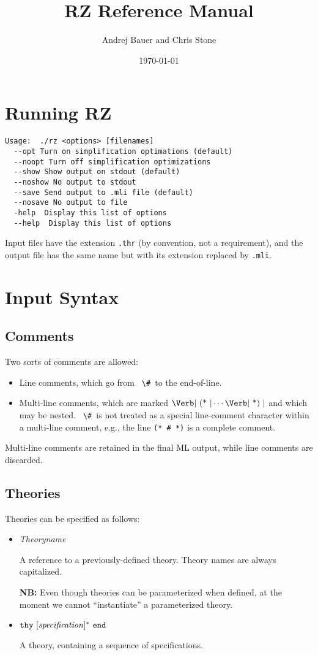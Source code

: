 \documentclass[11pt]{article}
\title{RZ Reference Manual}
\date{\today}
\author{Andrej Bauer and Chris Stone}
\newcommand{\keywd}[1]{\mbox{\texttt{#1}}\xspace}
\newcommand{\END}{\keywd{end}}
\newcommand{\THY}{\keywd{thy}}
\newcommand{\metav}[1]{\mbox{\textit{#1}}\xspace}
\newcommand{\TIdentifier}{\metav{Theoryname}}
\newcommand{\Specification}{\metav{specification}}
\newcommand{\HASH}{\mbox{\Verb| \# |}}
\newcommand{\LCOMMENT}{\mbox{\Verb| (* |}}
\newcommand{\RCOMMENT}{\mbox{\Verb| *) |}}
\newcommand{\NB}{\textbf{NB: }}
\begin{document}
\maketitle

\section{Running RZ}

\begin{Verbatim}
Usage:  ./rz <options> [filenames]
  --opt Turn on simplification optimations (default)
  --noopt Turn off simplification optimizations
  --show Show output on stdout (default)
  --noshow No output to stdout
  --save Send output to .mli file (default)
  --nosave No output to file
  -help  Display this list of options
  --help  Display this list of options
\end{Verbatim}

Input files have the extension \Verb|.thr| (by convention, not a requirement), and the 
output file has the same name but with its extension replaced by \Verb|.mli|.

\section{Input Syntax}

\subsection{Comments}

Two sorts of comments are allowed:
\begin{itemize}
\item Line comments, which go from \HASH to the end-of-line.
\item Multi-line comments, which are marked $\LCOMMENT \cdots
  \RCOMMENT$ and which may be nested.  \HASH is not treated as a
  special line-comment character within a multi-line comment, e.g.,
  the line \Verb|(* # *)| is a complete comment.
\end{itemize}

  Multi-line comments are retained in the final ML output, while line
  comments are discarded.

\subsection{Theories}

Theories can be specified as follows:
\begin{itemize}
\item \TIdentifier

   A reference to a previously-defined theory.  Theory names are always
   capitalized.
   
   \NB Even though theories can be parameterized when
     defined, at the moment we cannot ``instantiate'' a parameterized
     theory.

\item $\THY\ [\Specification]^*\ \END$

   A theory, containing a sequence of specifications.
\end{itemize}
\end{document}
